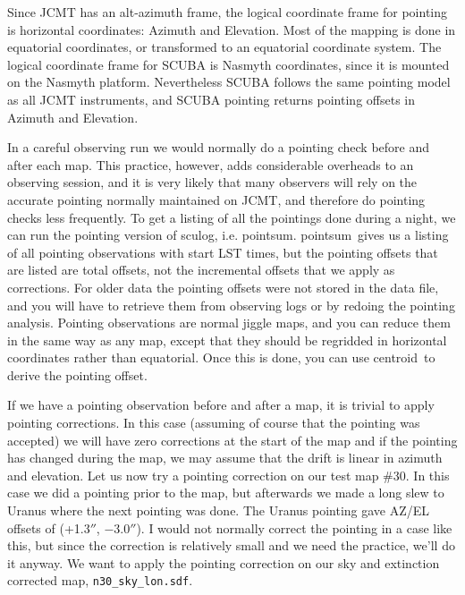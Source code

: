\documentclass[twoside,11pt]{article}
\newcommand{\task}[1]{\textsf{#1}}
\newcommand{\sculog}{\xref{\task{sculog}}{sun216}{SCULOG}}
\newcommand{\pointsum}{\xref{\task{pointsum}}{sun216}{POINTSUM}}
\newcommand{\centroid}{\xref{\task{centroid}}{sun95}{CENTROID}}
\newcommand{\xref}[3]{#1}
\begin{document}
{Since JCMT has an alt-azimuth frame, the logical coordinate frame for
pointing is horizontal coordinates: Azimuth and Elevation. Most of the
mapping is done in equatorial coordinates, or transformed to an equatorial
coordinate system. The logical coordinate frame for SCUBA is Nasmyth
coordinates, since it is mounted on the Nasmyth platform. Nevertheless
SCUBA follows the same pointing model as all JCMT instruments, and SCUBA
pointing returns pointing offsets in Azimuth and Elevation.

In a careful observing run we would normally do a pointing check before
and after each map. This practice, however, adds considerable overheads to
an observing session, and it is very likely that many observers will rely
on the accurate pointing normally maintained on JCMT, and therefore do
pointing checks less frequently. To get a listing of all the pointings
done during a night, we can run the pointing version of \sculog,
i.e. \pointsum. \pointsum\ gives us a listing of all pointing
observations with start LST times, but the pointing offsets that are
listed are total offsets, not the incremental offsets that we apply as
corrections. For older data the pointing offsets were not stored in the
data file, and you will have to retrieve them from observing logs or by
redoing the pointing analysis. Pointing observations are normal jiggle
maps, and you can reduce them in the same way as any map, except that they
should be regridded in horizontal coordinates rather than equatorial. Once
this is done, you can use \centroid\ to derive the pointing offset.

If we have a pointing observation before and after a map, it is trivial
to apply pointing corrections. In this case (assuming of course that the
pointing was accepted) we will have zero corrections at the start of
the map and if the pointing has changed during the map, we may assume
that the drift is linear in azimuth and elevation.   Let us now try a
pointing correction on our test map \#30. In this case we did a pointing
prior to the map, but afterwards we made a long slew to Uranus where
the next pointing was done. The Uranus pointing gave AZ/EL offsets of
(+1.3$''$, $-3.0''$). I would not normally correct the pointing in a case like
this, but since the correction is relatively small and we need the
practice, we'll do it anyway. We want to apply the pointing correction
on our sky and extinction corrected map, \texttt{n30\_sky\_lon.sdf}.

}
\end{document}
